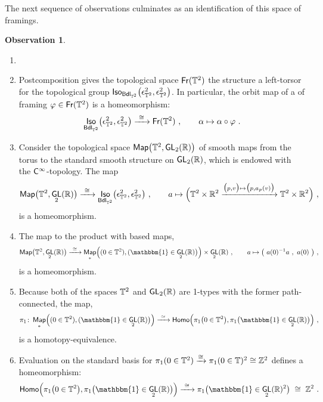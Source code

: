 \documentclass{amsart}
\theoremstyle{definition}
\newtheorem{observation}[theorem]{Observation}
\theoremstyle{remark}
\DeclareMathOperator{\Iso}{\sf Iso}
\DeclareMathOperator{\Map}{{\sf Map}}
\newcommand{\xra}{\xrightarrow}
\DeclareMathOperator{\uno}{\mathbbm{1}}
\DeclareMathOperator{\GL}{\sf GL}
\DeclareMathOperator{\Fr}{\sf Fr}
\DeclareMathOperator{\Bdl}{\sf Bdl}
\begin{document}
The next sequence of observations culminates as an identification of this space of framings.
\begin{observation}
\label{t20}


\begin{enumerate}
\item[~]


\item
Postcomposition gives the topological space $\Fr(\TT^2)$ the structure a left-torsor for the topological group $\Iso_{\Bdl_{\TT^2}}\bigl( \epsilon^2_{\TT^2} , \epsilon^2_{\TT^2} \bigr)$.
In particular, the orbit map of a of framing $\varphi \in \Fr(\TT^2)$ is a homeomorphism:
\begin{equation}
\label{e41}
\Iso_{\Bdl_{\TT^2}}\bigl( \epsilon^2_{\TT^2} , \epsilon^2_{\TT^2} \bigr)
\xra{~\cong~}
\Fr(\TT^2)
~,\qquad
\alpha \mapsto 
\alpha \circ \varphi 
~.
\end{equation}


\item
Consider the topological space $\Map \bigl( \TT^2 , \GL_2(\RR) \bigr)$ of smooth maps from the torus to the standard smooth structure on $\GL_2(\RR)$, which is endowed with the $\mathsf C^\infty$-topology. 
The map
\begin{equation}
\label{e43}
\Map \bigl( \TT^2 , \GL_2(\RR) \bigr)
\xra{~\cong~}
\Iso_{\Bdl_{\TT^2}}\bigl( \epsilon^2_{\TT^2} , \epsilon^2_{\TT^2} \bigr)
~,\qquad
a
\mapsto 
\Bigl(
\TT^2\times \RR^2
\xra{\bigl( p,v \bigr) \mapsto \bigl( p,a_p(v) \bigr) }
\TT^2 \times \RR^2
\Bigr)
~,
\end{equation}
is a homeomorphism.

\item
The map to the product with based maps,
\begin{equation}
\label{e44}
\Map \bigl( \TT^2 , \GL_2(\RR) \bigr)
\xra{~\cong~}
\Map_\ast\Bigl( ( 0\in \TT^2) , ( \uno \in \GL_2(\RR) \bigr) \Bigr)
\times
\GL_2(\RR)
~,\qquad
a
\mapsto 
\bigl(
~
a(0)^{-1} a~ ,~ a(0)
~
\bigr)
~,
\end{equation}
is a homeomorphism.


\item
Because both of the spaces $\mathbb T^2$ and $\GL_2(\RR)$ are 1-types with the former path-connected, 
the map,
\[
\pi_1
\colon
\Map_\ast\Bigl( ( 0\in \TT^2) , ( \uno \in \GL_2(\RR) \bigr) \Bigr)
\xra{~\simeq~}
{\sf Homo}\Bigl( \pi_1\bigl( 0 \in \TT^2 \bigr) , \pi_1\bigl( \uno \in \GL_2(\RR) \bigr) \Bigr) 
~,
\]
is a homotopy-equivalence.

\item
Evaluation on the standard basis for $\pi_1(0\in \TT^2) \xra{\cong} \pi_1(0\in \TT)^2 \cong \ZZ^2$ defines a homeomorphism:
\begin{equation}
\label{e45}
{\sf Homo}\Bigl( \pi_1\bigl( 0 \in \TT^2 \bigr) , \pi_1\bigl( \uno \in \GL_2(\RR) \bigr) \Bigr) 
\xra{~\cong~}
\pi_1\bigl( \uno \in \GL_2(\RR)^2 \bigr)
~\cong~
\ZZ^2
~.
\end{equation}


\end{enumerate}
\end{observation}
\end{document}
